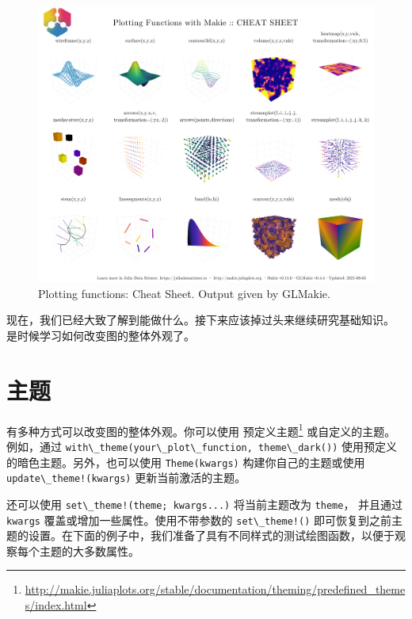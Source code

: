 \documentclass[
  notoc %
]{tufte-book}
\DeclareRobustCommand{\href}[2]{#2\footnote{\url{#1}}}
\newcommand{\passthrough}[1]{#1}
\begin{document}
\begin{figure}
\hypertarget{fig:cheat_sheet_glmakie}{%
\centering
\includegraphics{images/GLMakiePlottingFunctionsHide.png}
\caption{Plotting functions: Cheat Sheet. Output given by
GLMakie.}\label{fig:cheat_sheet_glmakie}
}
\end{figure}

现在，我们已经大致了解到能做什么。接下来应该掉过头来继续研究基础知识。
是时候学习如何改变图的整体外观了。

\hypertarget{sec:themes}{%
\section{主题}\label{sec:themes}}

有多种方式可以改变图的整体外观。你可以使用
\href{http://makie.juliaplots.org/stable/documentation/theming/predefined_themes/index.html}{预定义主题}
或自定义的主题。例如，通过
\passthrough{\lstinline!with\_theme(your\_plot\_function, theme\_dark())!}
使用预定义的暗色主题。另外，也可以使用
\passthrough{\lstinline!Theme(kwargs)!} 构建你自己的主题或使用
\passthrough{\lstinline"update\_theme!(kwargs)"} 更新当前激活的主题。

还可以使用 \passthrough{\lstinline"set\_theme!(theme; kwargs...)"}
将当前主题改为 \passthrough{\lstinline!theme!}， 并且通过
\passthrough{\lstinline!kwargs!} 覆盖或增加一些属性。使用不带参数的
\passthrough{\lstinline"set\_theme!()"}
即可恢复到之前主题的设置。在下面的例子中，我们准备了具有不同样式的测试绘图函数，以便于观察每个主题的大多数属性。
\end{document}
